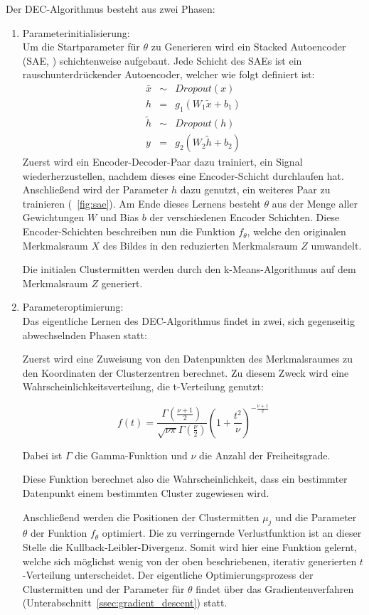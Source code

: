 Der DEC-Algorithmus besteht aus zwei Phasen:
\begin{enumerate}
	\item{Parameterinitialisierung:}\\
	Um die Startparameter für $\theta$ zu Generieren wird ein Stacked Autoencoder (SAE, \cite{vincent_10}) schichtenweise aufgebaut. Jede Schicht des SAEs ist ein rauschunterdrückender Autoencoder, welcher wie folgt definiert ist: \cite{junyuan_16}
	\begin{eqnarray}
	\bar{x}&\sim&Dropout(x)\\
	h &=& g_1(W_1\tilde{x}+b_1)\\
	\tilde{h} &\sim& Dropout(h)\\
	y &=& g_2(W_2\tilde{h}+b_2)
	\end{eqnarray}
	Zuerst wird ein Encoder-Decoder-Paar dazu trainiert, ein Signal wiederherzustellen, nachdem dieses eine Encoder-Schicht durchlaufen hat. Anschließend wird der Parameter $h$ dazu genutzt, ein weiteres Paar zu trainieren (\vgl \figurename~\ref{fig:sae}). Am Ende dieses Lernens besteht $\theta$ aus der Menge aller Gewichtungen $W$ und Bias $b$ der verschiedenen Encoder Schichten. Diese Encoder-Schichten beschreiben nun die Funktion $f_\theta$, welche den originalen Merkmalsraum $X$ des Bildes in den reduzierten Merkmalsraum $Z$ umwandelt.
	
	Die initialen Clustermitten werden durch den k-Means-Algorithmus auf dem Merkmalsraum $Z$ generiert.
	
	\item{Parameteroptimierung:}\\
	Das eigentliche Lernen des DEC-Algorithmus findet in zwei, sich gegenseitig abwechselnden Phasen statt:
	
	Zuerst wird eine Zuweisung von den Datenpunkten des Merkmalsraumes zu den Koordinaten der Clusterzentren berechnet. Zu diesem Zweck wird eine Wahrscheinlichkeitsverteilung, die t-Verteilung genutzt:
	
	\begin{equation}
		f(t)=\frac{\Gamma\left(\frac{\nu+1}{2}\right)}{\sqrt{\nu\pi}\Gamma\left(\frac{\nu}{2}\right)}\left(1+\frac{t^2}{\nu}\right)^{-\frac{\nu+1}{2}}
	\end{equation}
	
	Dabei ist $\Gamma$ die Gamma-Funktion und $\nu$ die Anzahl der Freiheitsgrade.
	
	Diese Funktion berechnet also die Wahrscheinlichkeit, dass ein bestimmter Datenpunkt einem bestimmten Cluster zugewiesen wird.
	
	Anschließend werden die Positionen der Clustermitten $\mu_j$ und die Parameter $\theta$ der Funktion $f_\theta$ optimiert. Die zu verringernde Verlustfunktion ist an dieser Stelle die Kullback-Leibler-Divergenz. Somit wird hier eine Funktion gelernt, welche sich möglichst wenig von der oben beschriebenen, iterativ generierten $t$-Verteilung unterscheidet. Der eigentliche Optimierungsprozess der Clustermitten und der Parameter für $\theta$ findet über das Gradientenverfahren (\vgl Unterabschnitt~\ref{ssec:gradient_descent}) statt.
\end{enumerate}

